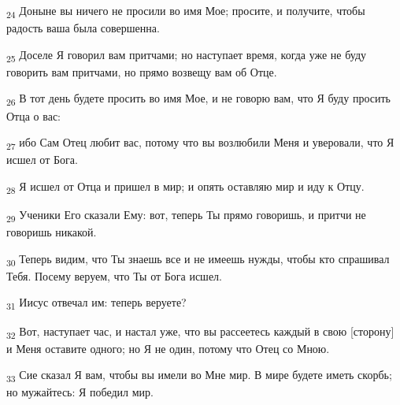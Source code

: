 \begin{tcolorbox}
\textsubscript{24} Доныне вы ничего не просили во имя Мое; просите, и получите, чтобы радость ваша была совершенна.
\end{tcolorbox}
\begin{tcolorbox}
\textsubscript{25} Доселе Я говорил вам притчами; но наступает время, когда уже не буду говорить вам притчами, но прямо возвещу вам об Отце.
\end{tcolorbox}
\begin{tcolorbox}
\textsubscript{26} В тот день будете просить во имя Мое, и не говорю вам, что Я буду просить Отца о вас:
\end{tcolorbox}
\begin{tcolorbox}
\textsubscript{27} ибо Сам Отец любит вас, потому что вы возлюбили Меня и уверовали, что Я исшел от Бога.
\end{tcolorbox}
\begin{tcolorbox}
\textsubscript{28} Я исшел от Отца и пришел в мир; и опять оставляю мир и иду к Отцу.
\end{tcolorbox}
\begin{tcolorbox}
\textsubscript{29} Ученики Его сказали Ему: вот, теперь Ты прямо говоришь, и притчи не говоришь никакой.
\end{tcolorbox}
\begin{tcolorbox}
\textsubscript{30} Теперь видим, что Ты знаешь все и не имеешь нужды, чтобы кто спрашивал Тебя. Посему веруем, что Ты от Бога исшел.
\end{tcolorbox}
\begin{tcolorbox}
\textsubscript{31} Иисус отвечал им: теперь веруете?
\end{tcolorbox}
\begin{tcolorbox}
\textsubscript{32} Вот, наступает час, и настал уже, что вы рассеетесь каждый в свою [сторону] и Меня оставите одного; но Я не один, потому что Отец со Мною.
\end{tcolorbox}
\begin{tcolorbox}
\textsubscript{33} Сие сказал Я вам, чтобы вы имели во Мне мир. В мире будете иметь скорбь; но мужайтесь: Я победил мир.
\end{tcolorbox}
